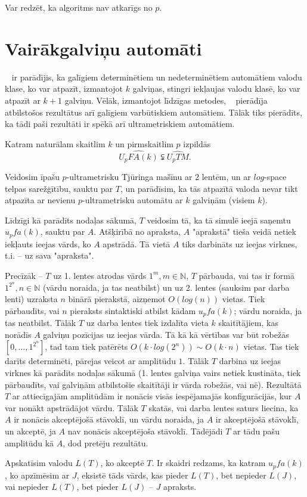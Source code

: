 \documentclass{ludis}
\begin{document}
\begin{pieradijums}
Var redzēt, ka algoritms nav atkarīgs no $p$.
\end{pieradijums}

\section{Vairākgalviņu automāti}
~\citet{Monien1980} ir parādījis, ka galīgiem determinētiem un nedeterminētiem automātiem valodu klase, ko var atpazīt, izmantojot $k$ galviņas, stingri iekļaujas valodu klasē, ko var atpazīt ar $k+1$ galviņu. Vēlāk, izmantojot līdzīgas metodes, ~\citet{Macarie1995} pierādīja atbilstošos rezultātus arī galīgiem varbūtiskiem automātiem. Tālāk tiks pierādīts, ka tādi paši rezultāti ir spēkā arī ultrametriskiem automātiem.

\begin{teorema} \label{atdalisana}
Katram naturālam skaitlim $k$ un pirmskaitlim $p$ izpildās
\[
	\widehat{U_pFA(k)} \subsetneqq \widehat{U_pTM}.
\]
\end{teorema}
\begin{pieradijums}
Veidosim īpašu $p$-ultrametrisku Tjūringa mašīnu ar $2$ lentēm, un ar $log$-space telpas sarežģītību, sauktu par $T$, un parādīsim, ka tās atpazītā valoda nevar tikt atpazīta ar nevienu $p$-ultrametrisku automātu ar $k$ galviņām (visiem $k$).

Līdzīgi kā parādīts nodaļas sākumā, $T$ veidosim tā, ka tā simulē ieejā saņemtu $u_pfa(k)$, sauktu par $A$. Atšķirībā no apraksta, $A$ "aprakstā" tieša veidā netiek iekļauts ieejas vārds, ko $A$ apstrādā. Tā vietā $A$ tiks darbināts uz ieejas virknes, t.i. -- uz sava "apraksta".

Precīzāk -- $T$ uz 1. lentes atrodas vārds $1^m, m \in \mathbb{N}$, $T$ pārbauda, vai tas ir formā $1^{2^n}, n \in \mathbb{N}$ (vārdu noraida, ja tas neatbilst) un uz 2. lentes (sauksim par darba lenti) uzraksta $n$ binārā pierakstā, aizņemot $O(log(n))$ vietas. Tiek pārbaudīts, vai $n$ pieraksts sintaktiski atbilst kādam $u_pfa(k)$; vārdu noraida, ja tas neatbilst. Tālāk $T$ uz darba lentes tiek izdalīta vieta $k$ skaitītājiem, kas norādīs $A$ galviņu pozīcijas uz ieejas vārda. Tā kā kā vērtības var būt robežās $\left[0, \ldots, 1^{2^n} \right]$, tad tam tiek patērēts $O(k \cdot log(2^n)) \sim O(k \cdot n)$ vietas. %
Tas tiek darīts determinēti, pārejas veicot ar amplitūdu $1$. Tālāk $T$ darbina uz ieejas virknes kā parādīts nodaļas sākumā (1. lentes galviņa vairs netiek kustināta, tiek pārbaudīts, vai galviņām atbilstošie skaitītāji ir vārda robežās, vai nē). Rezultātā $T$ ar attiecīgajām amplitūdām ir nonācis visās iespējamajās konfigurācijās, kur $A$ var nonākt apstrādājot vārdu. Tālāk $T$ skatās, vai darba lentes saturs liecina, ka $A$ ir nonācis akceptējošā stāvoklī, un vārdu noraida, ja $A$ ir akceptējošā stāvoklī, un akceptē, ja $A$ nav nonācis akceptējoša stāvoklī. Tādējādi $T$ ar tādu pašu amplitūdu kā $A$, dod pretēju rezultātu.

Apskatīsim valodu $L(T)$, ko akceptē $T$. Ir skaidri redzams, ka katram $u_pfa(k)$, ko apzīmēsim ar $J$, eksistē tāds vārds, kas pieder $L(T)$, bet nepieder $L(J)$, vai nepieder $L(T)$, bet pieder $L(J)$ -- $J$ apraksts.
\end{pieradijums}
\end{document}
